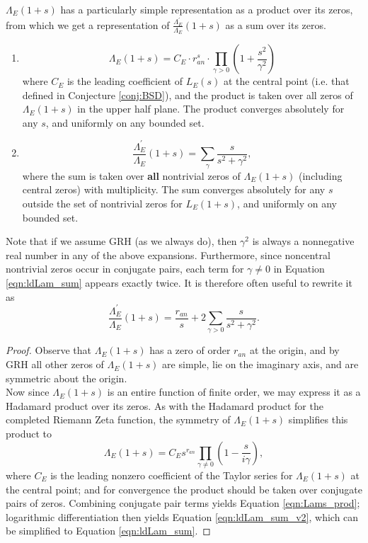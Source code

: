 \documentclass[10pt]{article}
\newcommand{\pr}{^{\prime}}
\newcommand{\Les}{L_E(s)}
\newcommand{\ldLam}[1]{\frac{\Lambda_E\pr}{\Lambda_E}\left(#1\right)}
\begin{document}
$\Lambda_E(1+s)$ has a particularly simple representation as a product over its zeros, from which we get a representation of $\ldLam{1+s}$ as a sum over its zeros.
\begin{lemma}  \mbox{}
\begin{enumerate}
\item \begin{equation}\label{eqn:Lams_prod}
\Lambda_E(1+s) = C_E\cdot r_{an}^s \cdot \prod_{\gamma > 0} \left(1+\frac{s^2}{\gamma^2}\right) 
\end{equation}
where $C_E$ is the leading coefficient of $\Les$ at the central point (i.e. that defined in Conjecture \ref{conj:BSD}), and the product is taken over all zeros of $\Lambda_E(1+s)$ in the upper half plane. The product converges absolutely for any $s$, and uniformly on any bounded set.
\item \begin{equation}\label{eqn:ldLam_sum}
\ldLam{1+s} = \sum_{\gamma} \frac{s}{s^2+\gamma^2}, 
\end{equation}
where the sum is taken over {\bf all} nontrivial zeros of $\Lambda_E(1+s)$ (including central zeros) with multiplicity. The sum converges absolutely for any $s$ outside the set of nontrivial zeros for $L_E(1+s)$, and uniformly on any bounded set. \\
\end{enumerate}
\end{lemma}

Note that if we assume GRH (as we always do), then $\gamma^2$ is always a nonnegative real number in any of the above expansions. Furthermore,  since noncentral nontrivial zeros occur in conjugate pairs, each term for $\gamma \ne 0$ in Equation \ref{eqn:ldLam_sum} appears exactly twice. It is therefore often useful to rewrite it as
\begin{equation}\label{eqn:ldLam_sum_v2}
\ldLam{1+s} = \frac{r_{an}}{s} + 2 \sum_{\gamma>0} \frac{s}{s^2+\gamma^2}.
\end{equation}

\begin{proof}
Observe that $\Lambda_E(1+s)$ has a zero of order $r_{an}$ at the origin, and by GRH all other zeros of $\Lambda_E(1+s)$ are simple, lie on the imaginary axis, and are symmetric about the origin. \\

Now since $\Lambda_E(1+s)$ is an entire function of finite order, we may express it as a Hadamard product over its zeros. As with the Hadamard product for the completed Riemann Zeta function, the symmetry of $\Lambda_E(1+s)$ simplifies this product to
\begin{equation}
\Lambda_E(1+s) = C_E s^{r_{an}}\prod_{\gamma\ne0}\left(1-\frac{s}{i\gamma}\right),
\end{equation}
where $C_E$ is the leading nonzero coefficient of the Taylor series for $\Lambda_E(1+s)$ at the central point; and for convergence the product should be taken over conjugate pairs of zeros. Combining conjugate pair terms yields Equation \ref{eqn:Lams_prod}; logarithmic differentiation then yields Equation \ref{eqn:ldLam_sum_v2}, which can be simplified to Equation \ref{eqn:ldLam_sum}.
\end{proof}
\end{document}
